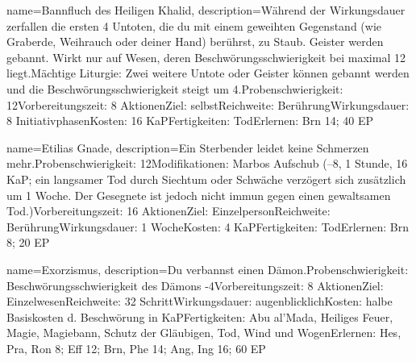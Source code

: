 {
    name={Bannfluch des Heiligen Khalid},
    description={Während der Wirkungsdauer zerfallen die ersten 4 Untoten, die du mit einem geweihten Gegenstand (wie Graberde, Weihrauch oder deiner Hand) berührst, zu Staub. Geister werden gebannt. Wirkt nur auf Wesen, deren Beschwörungsschwierigkeit bei maximal 12 liegt.\newline Mächtige Liturgie: Zwei weitere Untote oder Geister können gebannt werden und die Beschwörungsschwierigkeit steigt um 4.\newline Probenschwierigkeit: 12\newline Vorbereitungszeit: 8 Aktionen\newline Ziel: selbst\newline Reichweite: Berührung\newline Wirkungsdauer: 8 Initiativphasen\newline Kosten: 16 KaP\newline Fertigkeiten: Tod\newline Erlernen: Brn 14; 40 EP}
}


{
    name={Etilias Gnade},
    description={Ein Sterbender leidet keine Schmerzen mehr.\newline Probenschwierigkeit: 12\newline Modifikationen: Marbos Aufschub (–8, 1 Stunde, 16 KaP; ein langsamer Tod durch Siechtum oder Schwäche verzögert sich zusätzlich um 1 Woche. Der Gesegnete ist jedoch nicht immun gegen einen gewaltsamen Tod.)\newline Vorbereitungszeit: 16 Aktionen\newline Ziel: Einzelperson\newline Reichweite: Berührung\newline Wirkungsdauer: 1 Woche\newline Kosten: 4 KaP\newline Fertigkeiten: Tod\newline Erlernen: Brn 8; 20 EP}
}


{
    name={Exorzismus},
    description={Du verbannst einen Dämon.\newline Probenschwierigkeit: Beschwörungsschwierigkeit des Dämons -4\newline Vorbereitungszeit: 8 Aktionen\newline Ziel: Einzelwesen\newline Reichweite: 32 Schritt\newline Wirkungsdauer: augenblicklich\newline Kosten: halbe Basiskosten d. Beschwörung in KaP\newline Fertigkeiten: Abu al'Mada, Heiliges Feuer, Magie, Magiebann, Schutz der Gläubigen, Tod, Wind und Wogen\newline Erlernen: Hes, Pra, Ron 8; Eff 12; Brn, Phe 14; Ang, Ing 16; 60 EP}
}


